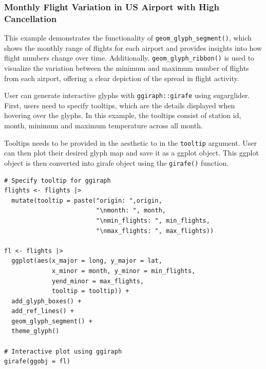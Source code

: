 \hypertarget{monthly-flight-variation-in-us-airport-with-high-cancellation}{%
\subsubsection{Monthly Flight Variation in US Airport with High Cancellation}\label{monthly-flight-variation-in-us-airport-with-high-cancellation}}

This example demonstrates the functionality of \texttt{geom\_glyph\_segment()}, which shows the monthly range of flights for each airport and provides insights into how flight numbers change over time. Additionally, \texttt{geom\_glyph\_ribbon()} is used to visualize the variation between the minimum and maximum number of flights from each airport, offering a clear depiction of the spread in flight activity.

User can generate interactive glyphs with \texttt{ggiraph::girafe} using sugarglider. First, users need to specify tooltips, which are the details displayed when hovering over the glyphs. In this example, the tooltips consist of station id, month, minimum and maximum temperature across all month.

Tooltips needs to be provided in the aesthetic to in the \texttt{tooltip} argument. User can then plot their desired glyph map and save it as a ggplot object. This ggplot object is then converted into girafe object using the \texttt{girafe()} function.

\begin{verbatim}
# Specify tooltip for ggiraph 
flights <- flights |>
  mutate(tooltip = paste("origin: ",origin,
                         "\nmonth: ", month,
                         "\nmin_flights: ", min_flights,
                         "\nmax_flights: ", max_flights))

fl <- flights |> 
  ggplot(aes(x_major = long, y_major = lat,
             x_minor = month, y_minor = min_flights,
             yend_minor = max_flights,
             tooltip = tooltip)) + 
  add_glyph_boxes() +
  add_ref_lines() +
  geom_glyph_segment() +
  theme_glyph()

# Interactive plot using ggiraph
girafe(ggobj = fl)
\end{verbatim}


